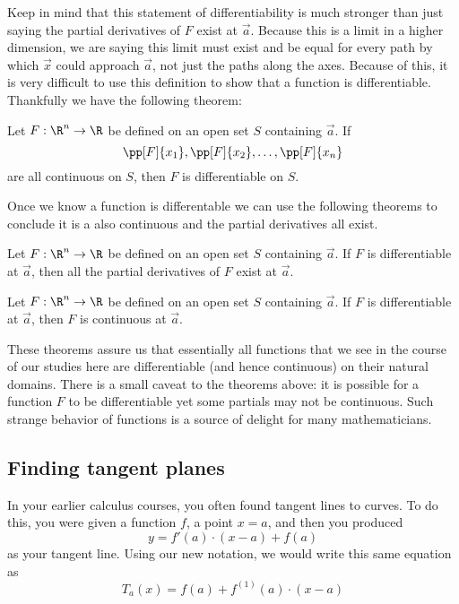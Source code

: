 \documentclass{ximera}
\begin{document}
Keep in mind that this statement of differentiability is much stronger than just saying the partial derivatives of $F$ exist at $\vec{a}$.  Because this is a limit in a higher dimension, we are saying this limit must exist and be equal for every path by which $\vec{x}$ could approach $\vec{a}$, not just the paths along the axes.  Because of this, it is very difficult to use this definition to show that a function is differentiable.  Thankfully we have the following theorem:

\begin{theorem}
  Let $F:\R^n\to\R$ be defined on an open set $S$ containing
  $\vec{a}$.  If
  \[
  \pp[F]{x_1},\pp[F]{x_2},\dots,\pp[F]{x_n}
  \]
  are all continuous on $S$, then $F$ is differentiable on $S$.
\end{theorem}

Once we know a function is differentable we can use the following theorems to conclude it is a also continuous and the partial derivatives all exist.

\begin{theorem}
Let $F:\R^n\to\R$ be defined on an open set $S$ containing
$\vec{a}$.  If $F$ is differentiable at $\vec{a}$, then all the partial derivatives of $F$ exist at $\vec{a}$.
\end{theorem}

\begin{theorem}
Let $F:\R^n\to\R$ be defined on an open set $S$ containing
$\vec{a}$.  If $F$ is differentiable at $\vec{a}$, then $F$ is
continuous at $\vec{a}$.
\end{theorem}

These theorems assure us that essentially all functions that we see in
the course of our studies here are differentiable (and hence
continuous) on their natural domains. There is a small caveat to the
theorems above: it is possible for a function $F$ to be differentiable
yet some partials may not be continuous. Such strange behavior of
functions is a source of delight for many mathematicians.

\subsection{Finding tangent planes}

In your earlier calculus courses, you often found tangent lines to
curves. To do this, you were given a function $f$, a point $x=a$, and
then you produced
\[
y = f'(a)\cdot (x-a) + f(a)
\]
as your tangent line. Using our new notation, we would write this same equation as
\[
T_a(x)=f(a)+f^{(1)}(a)\cdot (x-a)
\]
\end{document}
